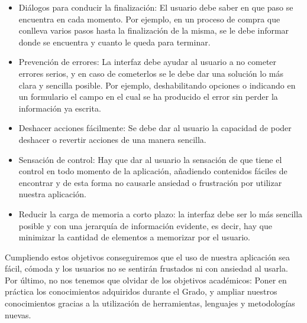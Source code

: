 \begin{itemize}
\begin{itemize}
		\item Diálogos para conducir la finalización: El usuario debe saber en que paso se encuentra en cada momento. Por ejemplo, en un proceso de compra que conlleva varios pasos hasta la finalización de la misma, se le debe informar donde se encuentra y cuanto le queda para terminar.
		\item Prevención de errores: La interfaz debe ayudar al usuario a no cometer errores serios, y en caso de cometerlos se le debe dar una solución lo más clara y sencilla posible. Por ejemplo, deshabilitando opciones o indicando en un formulario el campo en el cual se ha producido el error sin perder la información ya escrita.
		\item Deshacer acciones fácilmente: Se debe dar al usuario la capacidad de poder deshacer o revertir acciones de una manera sencilla. 
		\item Sensación de control: Hay que dar al usuario la sensación de que tiene el control en todo momento de la aplicación, añadiendo contenidos fáciles de encontrar y de esta forma no causarle ansiedad o frustración por utilizar nuestra aplicación.
		\item Reducir la carga de memoria a corto plazo:  la interfaz debe ser lo más sencilla posible y con una jerarquía de información evidente, es decir, hay que minimizar la cantidad de elementos a memorizar por el usuario.
	\end{itemize}
\end{itemize}
Cumpliendo estos objetivos conseguiremos que el uso de nuestra aplicación sea fácil, cómoda y los usuarios no se sentirán frustados ni con ansiedad al usarla. 
Por último, no nos tenemos que olvidar de los objetivos académicos: Poner en práctica los conocimientos adquiridos durante el Grado, y ampliar nuestros conocimientos gracias a la utilización de herramientas, lenguajes y metodologías nuevas.